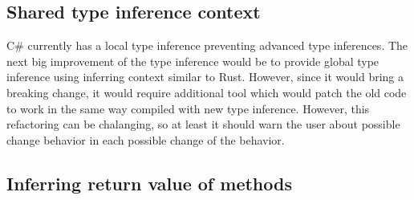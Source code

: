 \subsection{Shared type inference context}

C\# currently has a local type inference preventing advanced type inferences.
The next big improvement of the type inference would be to provide global type inference using inferring context similar to Rust.
However, since it would bring a breaking change, it would require additional tool which would patch the old code to work in the same way compiled with new type inference.
However, this refactoring can be chalanging, so at least it should warn the user about possible change behavior in each possible change of the behavior.

\subsection{Inferring return value of methods}

